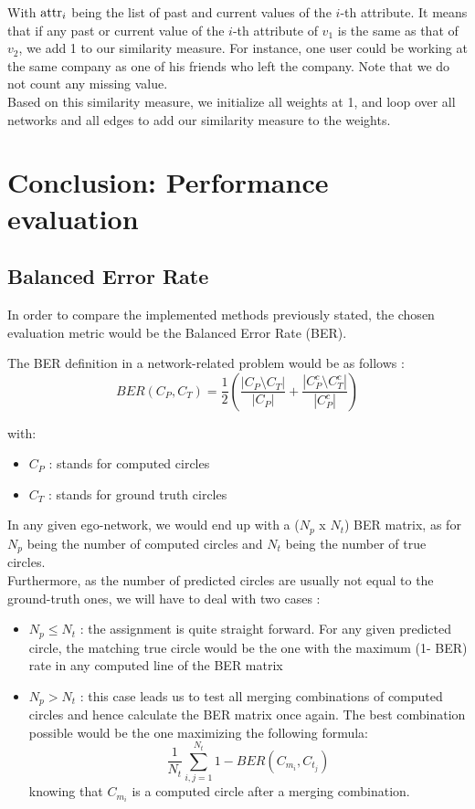 \documentclass[11pt]{article}       %
\begin{document}
With $\textup{attr}_i$ being the list of past and current values of the $i$-th attribute. It means that if any past or current value of the $i$-th attribute of $v_1$ is the same as that of $v_2$, we add 1 to our similarity measure. For instance, one user could be working at the same company as one of his friends who left the company. Note that we do not count any missing value.\\

Based on this similarity measure, we initialize all weights at 1, and loop over all networks and all edges to add our similarity measure to the weights.



\newpage

\section{Conclusion: Performance evaluation}\label{conclusion}

\subsection{Balanced Error Rate}
In order to compare the implemented methods previously stated, the chosen evaluation metric would be the Balanced Error Rate (BER).

The BER definition in a network-related problem would be as follows :
\begin{equation*}
\displaystyle BER(C_P,C_T) = \frac{1}{2} (\frac{|C_P \setminus C_T|}{|C_P|} + \frac{|C_P^c \setminus C_T^c|}{|C_P^c|})
\end{equation*}

with:
\begin{itemize}
\item $C_P$ : stands for computed circles
\item $C_T$ : stands for ground truth circles
\end{itemize}
\hfill \break

In any given ego-network, we would end up with a ($N_p$ x $N_t$) BER matrix, as for $N_p$ being the number of computed circles and $N_t$ being the number of true circles.\\

Furthermore, as the number of predicted circles are usually not equal to the ground-truth ones, we will have to deal with two cases :
\begin{itemize}
\item{$N_p \leq N_t$ :} the assignment is quite straight forward. For any given predicted circle, the matching true circle would be the one with the maximum (1- BER) rate in any computed line of the BER matrix 
\item{$N_p > N_t$ :} this case leads us to test all merging combinations of computed circles and hence calculate the BER matrix once again. The best combination possible would be the one maximizing the following formula:
\begin{equation*}
\frac{1}{N_t}\displaystyle\sum_{i,j=1}^{N_t}1 - BER(C_m_i,C_t_j)
\end{equation*}
knowing that $C_m_i$ is a computed circle after a merging combination.
\end{itemize}
\end{document}
